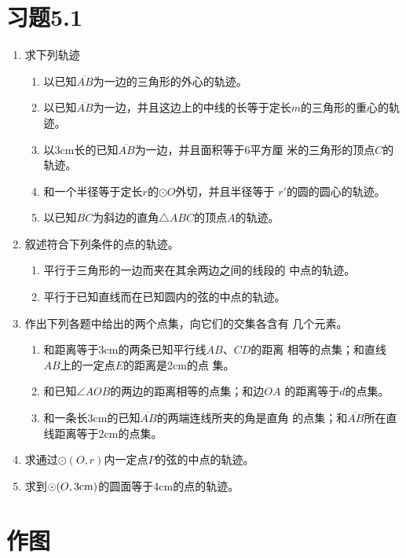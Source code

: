 \section*{习题5.1}
\begin{enumerate}
    \item 求下列轨迹
\begin{enumerate}
    \item 以已知$\overline{AB}$为一边的三角形的外心的轨迹。
    \item 以已知$\overline{AB}$为一边，并且这边上的中线的长等于定长$m$的三角形的重心的轨迹。
\item 以3cm长的已知$\overline{AB}$为一边，并且面积等于6平方厘
米的三角形的顶点$C$的轨迹。
\item 和一个半径等于定长$r$的$\odot O$外切，并且半径等于
$r'$的圆的圆心的轨迹。
\item 以已知$\overline{BC}$为斜边的直角$\triangle ABC$的顶点$A$的轨迹。
\end{enumerate}

\item 叙述符合下列条件的点的轨迹。
\begin{enumerate}
    \item 平行于三角形的一边而夹在其余两边之间的线段的
中点的轨迹。
\item 平行于已知直线而在已知圆内的弦的中点的轨迹。
\end{enumerate}
\item 作出下列各题中给出的两个点集，向它们的交集各含有
几个元素。

\begin{enumerate}
    \item 和距离等于3cm的两条已知平行线$AB$、$CD$的距离
相等的点集；和直线$AB$上的一定点$E$的距离是2cm的点
集。
\item 和已知$\angle AOB$的两边的距离相等的点集；和边$OA$
的距离等于$d$的点集。
\item 和一条长3cm的已知$\overline{AB}$的两端连线所夹的角是直角
的点集；和$\overline{AB}$所在直线距离等于2cm的点集。
\end{enumerate}


\item 求通过$\odot (O,r)$内一定点$P$的弦的中点的轨迹。
\item 求到$\odot(O,3{\rm cm})$的圆面等于4cm的点的轨迹。
\end{enumerate}

\section{作图}
